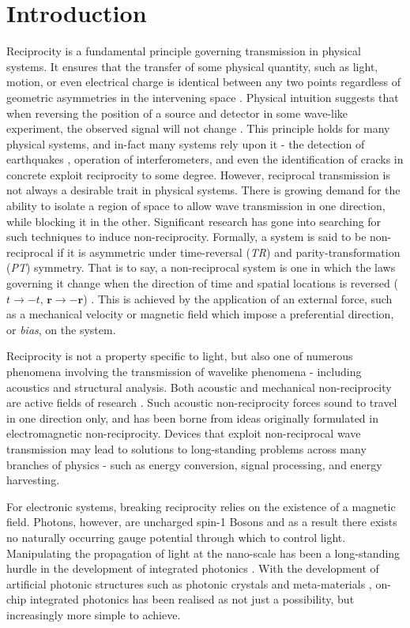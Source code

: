 \chapter{Introduction}
Reciprocity is a fundamental principle governing transmission in physical systems. It ensures that the transfer of some physical quantity, such as light, motion, or even electrical charge is identical between any two points regardless of geometric asymmetries in the intervening space \cite{Coulais2017}. Physical intuition suggests that when reversing the position of a source and detector in some wave-like experiment, the observed signal will not change \cite{Deak2012}. This principle holds for many physical systems, and in-fact many systems rely upon it - the detection of earthquakes \cite{Buehler2016}, operation of interferometers, and even the identification of cracks in concrete \cite{Scalerandi2012c, Scalerandi2012} exploit reciprocity to some degree. However, reciprocal transmission is not always a desirable trait in physical systems. There is growing demand for the ability to isolate a region of space to allow wave transmission in one direction, while blocking it in the other. Significant research has gone into searching for such techniques to induce non-reciprocity. Formally, a system is said to be non-reciprocal if it is asymmetric under time-reversal (\textit{TR}) and parity-transformation (\textit{PT}) symmetry. That is to say, a non-reciprocal system is one in which the laws governing it change when the direction of time and spatial locations is reversed ($t \rightarrow -t$, $\bm{r} \rightarrow -\bm{r}$) \cite{Caloz2016}. This is achieved by the application of an external force, such as a mechanical velocity or magnetic field which impose a preferential direction, or \textit{bias}, on the system. 

Reciprocity is not a property specific to light, but also one of numerous phenomena involving the transmission of wavelike phenomena - including acoustics and structural analysis. Both acoustic and mechanical non-reciprocity are active fields of research \cite{Coulais2017}. Such acoustic non-reciprocity forces sound to travel in one direction only, and has been borne from ideas originally formulated in electromagnetic non-reciprocity. Devices that exploit non-reciprocal wave transmission may lead to solutions to long-standing problems across many branches of physics - such as energy conversion, signal processing, and energy harvesting.

\newpage

For electronic systems, breaking reciprocity relies on the existence of a magnetic field. Photons, however, are uncharged spin-1 Bosons and as a result there exists no naturally occurring gauge potential through which to control light. Manipulating the propagation of light at the nano-scale has been a long-standing hurdle in the development of integrated photonics \cite{Hua2016a,Huang2016,Bi2013,Doerr2013,Doerr2014,El-Ganainy2013,Bi2011}. With the development of artificial photonic structures such as photonic crystals and meta-materials \cite{Joannopoulos1997}, on-chip integrated photonics has been realised as not just a possibility, but increasingly more simple to achieve.

